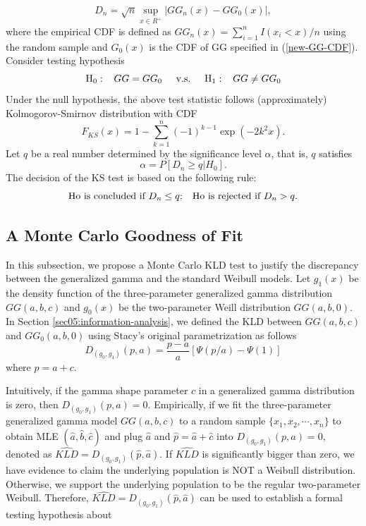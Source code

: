 \documentclass{ps}
\theoremstyle{plain}%
\theoremstyle{definition}
\theoremstyle{remark}
\begin{document}
\begin{equation}
	D_n=\sqrt{n} \sup_{x\in R^+} |GG_n(x) - GG_0(x)|, 
\end{equation}
\noindent where the empirical CDF is defined as $GG_n(x) = \sum_{i=1}^n I(x_i<x)/n$ using the random sample and $G_0(x)$ is the CDF of GG specified in (\ref{new-GG-CDF}). Consider testing hypothesis
$$
\mbox{H}_0:\hspace{3mm} GG = GG_0 \hspace{5mm}\mbox{v.s.}\hspace{5mm}\mbox{H}_1:\hspace{3mm} GG \ne GG_0
$$
Under the null hypothesis, the above test statistic follows (approximately) Kolmogorov-Smirnov distribution with CDF
$$
F_{KS}(x) = 1 -\sum_{k=1}^n(-1)^{k-1}\exp(-2k^2x).
$$
Let $q$ be a real number determined by the significance level $\alpha$, that is, $q$ satisfies
$$
\alpha = P[D_n \ge q | H_0].
$$
The decision of the KS test is based on the following rule:  
\begin{equation}
	\mbox{Ho is concluded if } D_n \le q; \hspace{3mm}\mbox{Ho is rejected if } D_n > q.
\end{equation}


\subsection{A Monte Carlo Goodness of Fit}\label{KL-Test}

In this subsection, we propose a Monte Carlo KLD test to justify the discrepancy between the generalized gamma and the standard Weibull models. Let $g_1(x)$ be the density function of the three-parameter generalized gamma distribution $GG(a, b, c)$ and $g_0(x)$ be the two-parameter Weill distribution $GG(a, b, 0)$. In Section \ref{sec05:information-analysis}, we defined the KLD between  $GG(a, b, c)$ and $GG_0(a, b, 0)$ using Stacy’s \cite{Stacy-1962} original parametrization as follows
\begin{equation}\label{KL-statistic}
	D_{(g_0, g_1)}(p,a) = \frac{p-a}{a}\left[\Psi(p/a)-\Psi(1) \right]
\end{equation}
\noindent where $p = a + c$. 

Intuitively, if the gamma shape parameter $c$ in a generalized gamma distribution is zero, then $D_{(g_0, g_1)}(p,a) = 0$. Empirically, if we fit the three-parameter generalized gamma model $GG(a, b, c)$ to a random sample $\{x_1, x_2, \cdots, x_n\}$ to obtain MLE $(\hat{a}, \hat{b}, \hat{c})$ and plug $\hat{a}$ and $\hat{p} = \hat{a} + \hat{c}$ into $D_{(g_0, g_1)}(p,a) = 0$, denoted as $\widehat{KLD} = D_{(g_0, g_1)}(\hat{p},\hat{a})$. If $\widehat{KLD}$ is significantly bigger than zero, we have evidence to claim the underlying population is NOT a Weibull distribution. Otherwise, we support the underlying population to be the regular two-parameter Weibull. Therefore, $\widehat{KLD} = D_{(g_0, g_1)}(\hat{p},\hat{a})$ can be used to establish a formal testing hypothesis about  
\end{document}
